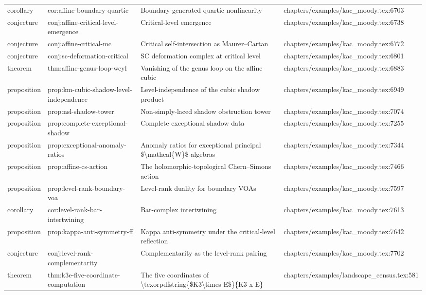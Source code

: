 \documentclass[11pt]{article}
\begin{document}
\begin{longtable}{L{0.10\textwidth}L{0.26\textwidth}L{0.42\textwidth}L{0.22\textwidth}}
corollary & cor:affine-boundary-quartic & Boundary-generated quartic nonlinearity & chapters/examples/kac\_moody.tex:6703\\
conjecture & conj:affine-critical-level-emergence & Critical-level emergence & chapters/examples/kac\_moody.tex:6738\\
conjecture & conj:affine-critical-mc & Critical self-intersection as Maurer--Cartan & chapters/examples/kac\_moody.tex:6772\\
conjecture & conj:sc-deformation-critical & SC deformation complex at critical level & chapters/examples/kac\_moody.tex:6801\\
theorem & thm:affine-genus-loop-weyl & Vanishing of the genus loop on the affine cubic & chapters/examples/kac\_moody.tex:6883\\
proposition & prop:km-cubic-shadow-level-independence & Level-independence of the cubic shadow product & chapters/examples/kac\_moody.tex:6949\\
proposition & prop:nsl-shadow-tower & Non-simply-laced shadow obstruction tower & chapters/examples/kac\_moody.tex:7074\\
proposition & prop:complete-exceptional-shadow & Complete exceptional shadow data & chapters/examples/kac\_moody.tex:7255\\
proposition & prop:exceptional-anomaly-ratios & Anomaly ratios for exceptional principal \$\textbackslash{}mathcal\{W\}\$-algebras & chapters/examples/kac\_moody.tex:7344\\
proposition & prop:affine-cs-action & The holomorphic-topological Chern--Simons action & chapters/examples/kac\_moody.tex:7466\\
proposition & prop:level-rank-boundary-voa & Level-rank duality for boundary VOAs & chapters/examples/kac\_moody.tex:7597\\
corollary & cor:level-rank-bar-intertwining & Bar-complex intertwining & chapters/examples/kac\_moody.tex:7613\\
proposition & prop:kappa-anti-symmetry-ff & Kappa anti-symmetry under the critical-level reflection & chapters/examples/kac\_moody.tex:7642\\
conjecture & conj:level-rank-complementarity & Complementarity as the level-rank pairing & chapters/examples/kac\_moody.tex:7702\\
theorem & thm:k3e-five-coordinate-computation & The five coordinates of \textbackslash{}texorpdfstring\{\$K3\textbackslash{}times E\$\}\{K3 x E\} & chapters/examples/landscape\_census.tex:581\\

\end{longtable}
\end{document}
